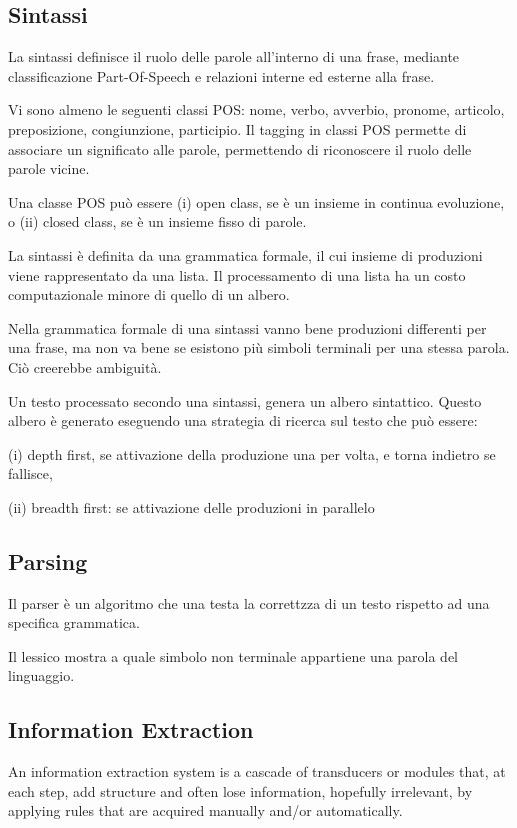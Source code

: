 \subsection{Sintassi}
La sintassi definisce il ruolo delle parole all'interno di una frase, mediante classificazione Part-Of-Speech e relazioni interne ed esterne alla frase.

Vi sono almeno le seguenti classi POS: nome, verbo, avverbio, pronome, articolo, preposizione, congiunzione, participio.
Il tagging in classi POS permette di associare un significato alle parole, permettendo di riconoscere il ruolo delle parole vicine.

Una classe POS può essere (i) open class, se è un insieme in continua evoluzione, o (ii) closed class, se è un insieme fisso di parole.

La sintassi è definita da una grammatica formale, il cui insieme di produzioni viene rappresentato da una lista. Il processamento di una lista ha un costo computazionale minore di quello di un albero.

Nella grammatica formale di una sintassi vanno bene produzioni differenti per una frase, ma non va bene se esistono più simboli terminali per una stessa parola. Ciò creerebbe ambiguità.

Un testo processato secondo una sintassi, genera un albero sintattico. Questo albero è generato eseguendo una strategia di ricerca sul testo che può essere: 

(i) depth first, se attivazione della produzione una per volta, e torna indietro se fallisce,

(ii) breadth first: se attivazione delle produzioni in parallelo


\subsection{Parsing}
Il parser è un algoritmo che una testa la correttzza di un testo rispetto ad una specifica grammatica.

Il lessico mostra a quale simbolo non terminale appartiene una parola del linguaggio.


\subsection{Information Extraction}
An information extraction system is a cascade of transducers or modules that, at each step, add structure and often lose information, hopefully irrelevant, by applying rules that are acquired manually and/or automatically.

